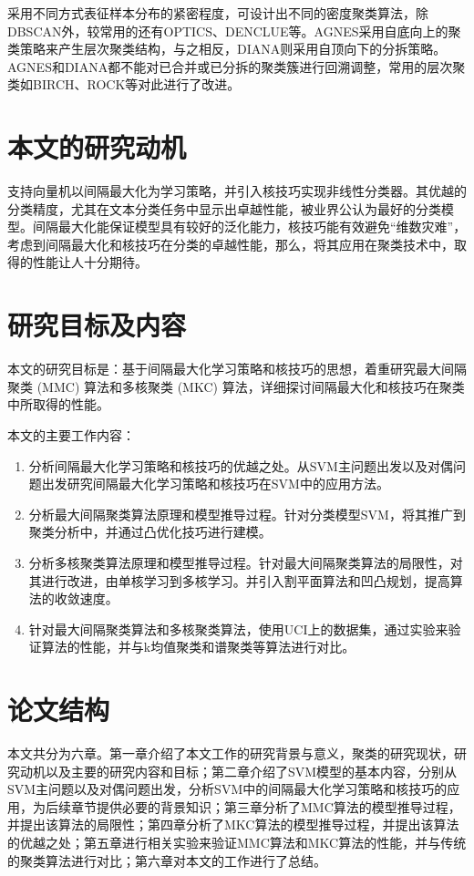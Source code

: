 采用不同方式表征样本分布的紧密程度，可设计出不同的密度聚类算法，除DBSCAN外，较常用的还有OPTICS、DENCLUE等。AGNES采用自底向上的聚类策略来产生层次聚类结构，与之相反，DIANA则采用自顶向下的分拆策略。AGNES和DIANA都不能对已合并或已分拆的聚类簇进行回溯调整，常用的层次聚类如BIRCH、ROCK等对此进行了改进。

\section{本文的研究动机}
支持向量机以间隔最大化为学习策略，并引入核技巧实现非线性分类器。其优越的分类精度，尤其在文本分类任务中显示出卓越性能，被业界公认为最好的分类模型。间隔最大化能保证模型具有较好的泛化能力，核技巧能有效避免“维数灾难”，考虑到间隔最大化和核技巧在分类的卓越性能，那么，将其应用在聚类技术中，取得的性能让人十分期待。

\section{研究目标及内容}
本文的研究目标是：基于间隔最大化学习策略和核技巧的思想，着重研究最大间隔聚类 (MMC) 算法和多核聚类 (MKC) 算法，详细探讨间隔最大化和核技巧在聚类中所取得的性能。


本文的主要工作内容：
\begin{enumerate}[fullwidth,itemindent=24pt]
  \item 分析间隔最大化学习策略和核技巧的优越之处。从SVM主问题出发以及对偶问题出发研究间隔最大化学习策略和核技巧在SVM中的应用方法。
  \item 分析最大间隔聚类算法原理和模型推导过程。针对分类模型SVM，将其推广到聚类分析中，并通过凸优化技巧进行建模。
  \item 分析多核聚类算法原理和模型推导过程。针对最大间隔聚类算法的局限性，对其进行改进，由单核学习到多核学习。并引入割平面算法和凹凸规划，提高算法的收敛速度。
  \item 针对最大间隔聚类算法和多核聚类算法，使用UCI上的数据集，通过实验来验证算法的性能，并与k均值聚类和谱聚类等算法进行对比。
\end{enumerate}
  
\section{论文结构}
本文共分为六章。第一章介绍了本文工作的研究背景与意义，聚类的研究现状，研究动机以及主要的研究内容和目标；第二章介绍了SVM模型的基本内容，分别从SVM主问题以及对偶问题出发，分析SVM中的间隔最大化学习策略和核技巧的应用，为后续章节提供必要的背景知识；第三章分析了MMC算法的模型推导过程，并提出该算法的局限性；第四章分析了MKC算法的模型推导过程，并提出该算法的优越之处；第五章进行相关实验来验证MMC算法和MKC算法的性能，并与传统的聚类算法进行对比；第六章对本文的工作进行了总结。